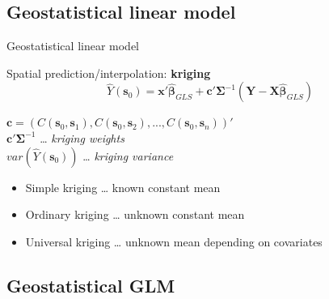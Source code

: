 \documentclass[
  ignorenonframetext,
]{beamer}
\providecommand{\tightlist}{%
  \setlength{\itemsep}{0pt}\setlength{\parskip}{0pt}}
\begin{document}
\hypertarget{geostatistical-linear-model-1}{%
\subsection{Geostatistical linear
model}\label{geostatistical-linear-model-1}}

\begin{frame}{Geostatistical linear model}
\small

Spatial prediction/interpolation: \textbf{kriging}
\[\hat{Y}(\boldsymbol{s}_0) = \boldsymbol{x}'\hat{\boldsymbol{\beta}}_{GLS}+\boldsymbol{c}'\boldsymbol{\Sigma}^{-1}(\boldsymbol{Y}-\boldsymbol{X}\hat{\boldsymbol{\beta}}_{GLS})\]

\(\boldsymbol{c} = (C(\boldsymbol{s}_0, \boldsymbol{s}_1),C(\boldsymbol{s}_0, \boldsymbol{s}_2),...,C(\boldsymbol{s}_0, \boldsymbol{s}_n))'\)\\
\(\boldsymbol{c}'\boldsymbol{\Sigma}^{-1}\) \ldots{} \emph{kriging
weights}\\
\(var(\hat{Y}(\boldsymbol{s}_0))\) \ldots{} \emph{kriging variance}

\begin{itemize}
\tightlist
\item
  Simple kriging \ldots{} known constant mean
\item
  Ordinary kriging \ldots{} unknown constant mean
\item
  Universal kriging \ldots{} unknown mean depending on covariates
\end{itemize}
\end{frame}

\hypertarget{geostatistical-glm}{%
\subsection{Geostatistical GLM}\label{geostatistical-glm}}
\end{document}
